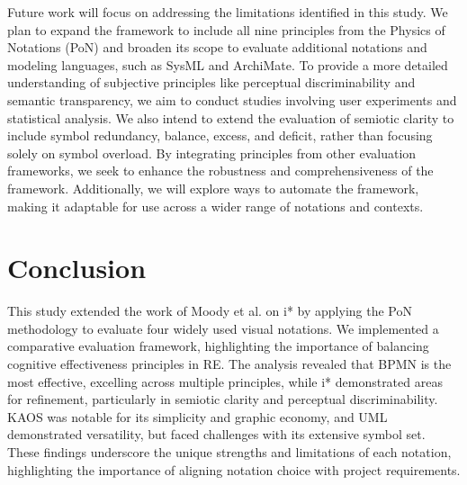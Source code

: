 \documentclass[runningheads]{llncs}
\begin{document}
Future work will focus on addressing the limitations identified in this study. We plan to expand the framework to include all nine principles from the Physics of Notations (PoN) and broaden its scope to evaluate additional notations and modeling languages, such as SysML and ArchiMate. To provide a more detailed understanding of subjective principles like perceptual discriminability and semantic transparency, we aim to conduct studies involving user experiments and statistical analysis. We also intend to extend the evaluation of semiotic clarity to include symbol redundancy, balance, excess, and deficit, rather than focusing solely on symbol overload. By integrating principles from other evaluation frameworks, we seek to enhance the robustness and comprehensiveness of the framework. Additionally, we will explore ways to automate the framework, making it adaptable for use across a wider range of notations and contexts.

\section{Conclusion}
This study extended the work of Moody et al. \cite{Moody2010} on i* by applying the PoN methodology to evaluate four widely used visual notations. We implemented a comparative evaluation framework, highlighting the importance of balancing cognitive effectiveness principles in RE. The analysis revealed that BPMN is the most effective, excelling across multiple principles, while i* demonstrated areas for refinement, particularly in semiotic clarity and perceptual discriminability. KAOS was notable for its simplicity and graphic economy, and UML demonstrated versatility, but faced challenges with its extensive symbol set. These findings underscore the unique strengths and limitations of each notation, highlighting the importance of aligning notation choice with project requirements.




%
%
%
% 
% 
%
   
 
\end{document}
